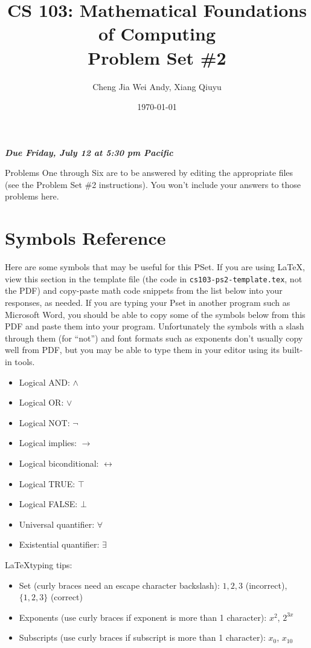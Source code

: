 \documentclass{article}
\title{CS 103: Mathematical Foundations of Computing\\Problem Set \#2}
\author{Cheng Jia Wei Andy, Xiang Qiuyu}
\date{\today}
\renewcommand{\(}{\left(}
\renewcommand{\)}{\right)}
\renewcommand{\emph}[1]{\textit{\textbf{#1}}}
\theoremstyle{plain}
\theoremstyle{plain}
\theoremstyle{definition}
\begin{document}
\maketitle

\begin{center}
  \emph{Due Friday, July 12 at 5:30 pm Pacific}
\end{center}

\vspace{1cm}

Problems One through Six are to be answered by editing the appropriate files (see the Problem Set \#2 instructions). You won't include your answers to those problems here.

\section*{Symbols Reference}
Here are some symbols that may be useful for this PSet. If you are using \LaTeX, view this section in the template file (the code in \texttt{cs103-ps2-template.tex}, not the PDF) and copy-paste math code snippets from the list below into your responses, as needed. If you are typing your Pset in another program such as Microsoft Word, you should be able to copy some of the symbols below from this PDF and paste them into your program. Unfortunately the symbols with a slash through them (for ``not'') and font formats such as exponents don't usually copy well from PDF, but you may be able to type them in your editor using its built-in tools.
\begin{itemize}
    \item Logical AND: $\land$
    \item Logical OR: $\lor$
    \item Logical NOT: $\lnot$
    \item Logical implies: $\to$
    \item Logical biconditional: $\leftrightarrow$
    \item Logical TRUE: $\top$
    \item Logical FALSE: $\bot$
    \item Universal quantifier: $\forall$
    \item Existential quantifier: $\exists$
\end{itemize}

\LaTeX typing tips:
\begin{itemize}
    \item Set (curly braces need an escape character backslash): ${1, 2, 3}$ (incorrect), $\{1, 2, 3\}$ (correct)
    \item Exponents (use curly braces if exponent is more than 1 character): $x^2$, $2^{3x}$
    \item Subscripts (use curly braces if subscript is more than 1 character): $x_0$, $x_{10}$
\end{itemize}
    
\end{document}
